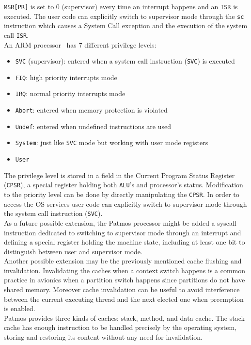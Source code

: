 \texttt{MSR[PR]} is set to 0 (supervisor) every time an interrupt happens and an \texttt{ISR} is executed. The user code can explicitly switch to supervisor mode through the \texttt{sc} instruction which causes a System Call exception and the execution of the system call \texttt{ISR}.\\ An ARM processor~\cite{ARMmig:2012} has 7 different privilege levels:

\begin{itemize}
	\item \texttt{SVC} (supervisor): entered when a system call instruction (\texttt{SVC}) is executed
	\item \texttt{FIQ}: high priority interrupts mode
	\item \texttt{IRQ}: normal priority interrupts mode
	\item \texttt{Abort}: entered when memory protection is violated
	\item \texttt{Undef}: entered when undefined instructions are used
	\item \texttt{System}: just like \texttt{SVC} mode but working with user mode registers
	\item \texttt{User}
\end{itemize}

The privilege level is stored in a field in the Current Program Status Register (\texttt{CPSR}), a special register holding both \texttt{ALU}'s and processor's status. Modification to the priority level can be done by directly manipulating the \texttt{CPSR}. In order to access the OS services user code can explicitly switch to supervisor mode through the system call instruction (\texttt{SVC}).\\

As a future possible extension, the Patmos processor might be added a syscall instruction dedicated to switching to supervisor mode through an interrupt and defining a special register holding the machine state, including at least one bit to distinguish between user and supervisor mode.\\

Another possible extension may be the previously mentioned cache flushing and invalidation. Invalidating the caches when a context switch happens is a common practice in avionics when a partition switch happens since partitions do not have shared memory. Moreover cache invalidation can be useful to avoid interference between the current executing thread and the next elected one when preemption is enabled.\\

Patmos provides three kinds of caches: stack, method, and data cache. The stack cache has enough instruction to be handled precisely by the operating system, storing and restoring its content without any need for invalidation. 






